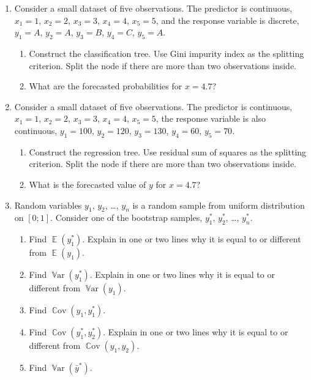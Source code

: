 \documentclass[12pt]{article}
\DeclareMathOperator{\Cov}{\mathbb{C}ov}
\DeclareMathOperator{\Var}{\mathbb{V}ar}
\DeclareMathOperator{\E}{\mathbb{E}}
\begin{document}
\begin{enumerate}
\item Consider a small dataset of five observations.
The predictor is continuous, $x_1 = 1$, $x_2 = 2$, $x_3 = 3$, $x_4 = 4$, $x_5 = 5$,
and the response variable is discrete, $y_1 = A$, $y_2 = A$, $y_3 = B$, $y_4 = C$, $y_5 = A$.

\begin{enumerate}
    \item Construct the classification tree. 
    Use Gini impurity index as the splitting criterion.
    Split the node if there are more than two observations inside. 
    \item What are the forecasted probabilities for $x = 4.7$?
\end{enumerate}

\item Consider a small dataset of five observations.
The predictor is continuous, $x_1 = 1$, $x_2 = 2$, $x_3 = 3$, $x_4 = 4$, $x_5 = 5$,
the response variable is also continuous, $y_1 = 100$, $y_2 = 120$, $y_3 = 130$, $y_4 = 60$, $y_5 = 70$.

\begin{enumerate}
    \item Construct the regression tree. 
    Use residual sum of squares as the splitting criterion.
    Split the node if there are more than two observations inside. 
    \item What is the forecasted value of $y$ for $x = 4.7$?
\end{enumerate}


\item Random variables $y_1$, $y_2$, \ldots, $y_n$ is a random sample from uniform 
distribution on $[0;1]$. 
Consider one of the bootstrap samples, $y_1^*$, $y_2^*$, \ldots, $y_n^*$.

\begin{enumerate}
    \item Find $\E(y_1^*)$. 
    Explain in one or two lines why it is equal to or different from  $\E(y_1)$.
    \item Find $\Var(y_1^*)$. 
    Explain in one or two lines why it is equal to or different from  $\Var(y_1)$.
    \item Find $\Cov(y_1, y_1^*)$.
    \item Find $\Cov(y_1^*, y_2^*)$. 
    Explain in one or two lines why it is equal to or different from   $\Cov(y_1, y_2)$.
    \item Find $\Var(\bar y^*)$.
\end{enumerate}

\end{enumerate}
\end{document}
